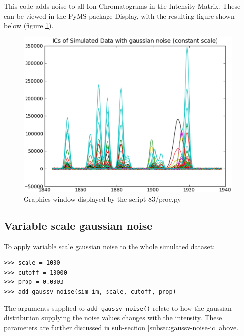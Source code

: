 This code adds noise to all Ion Chromatograms in the Intensity Matrix. These can be 
viewed in the PyMS package Display, with the resulting figure shown below (figure 
\ref{fig:gaussc-noise}).



\begin{figure}[h]
  \begin{center}
    \includegraphics[scale=0.25]{graphics/chapter10/test-83.eps}
  \end{center}
  \caption{Graphics window displayed by the script 83/proc.py}
  \label{fig:gaussc-noise}
\end{figure}


\subsection{Variable scale gaussian noise}
\label{subsec:gaussv-noise}

To apply variable scale gaussian noise to the whole simulated dataset:

\begin{verbatim}
>>> scale = 1000
>>> cutoff = 10000
>>> prop = 0.0003
>>> add_gaussv_noise(sim_im, scale, cutoff, prop)
\end{verbatim}

The arguments supplied to {\tt add\_gaussv\_noise()} relate to how the gaussian distribution
supplying the noise values changes with the intensity. These parameters are further discussed in 
sub-section \ref{subsec:gaussv-noise-ic} above.

